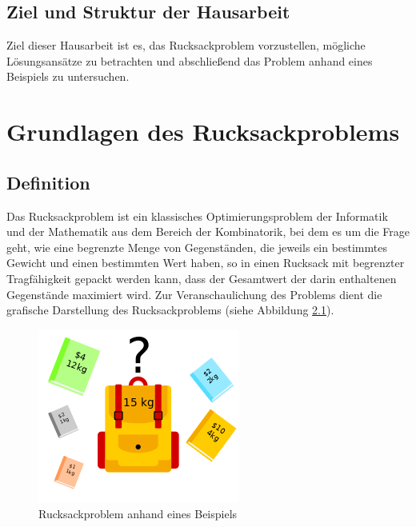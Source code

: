 \documentclass[12pt]{report}
\begin{document}
\section{Ziel und Struktur der Hausarbeit}
Ziel dieser Hausarbeit ist es, das Rucksackproblem vorzustellen, mögliche Lösungsansätze zu betrachten und abschließend das Problem anhand eines Beispiels zu untersuchen. 


\newpage
\chapter{Grundlagen des Rucksackproblems}


\section{Definition}



Das Rucksackproblem ist ein klassisches Optimierungsproblem der Informatik und der Mathematik aus dem Bereich der Kombinatorik, bei dem es um die Frage geht, wie eine begrenzte Menge von Gegenständen, die jeweils ein bestimmtes Gewicht und einen bestimmten Wert haben, so in einen Rucksack mit begrenzter Tragfähigkeit gepackt werden kann, dass der Gesamtwert der darin enthaltenen Gegenstände maximiert wird. Zur Veranschaulichung des Problems dient die grafische Darstellung des Rucksackproblems (siehe Abbildung \ref{fig:rucksackproblem}). 

\begin{figure}[h]
	\centering
	\includegraphics[width=0.5 \linewidth]{Knapsack_Problem_Illustration}
	\caption{Rucksackproblem anhand eines Beispiels}
	\label{fig:rucksackproblem}
\end{figure}
\end{document}
